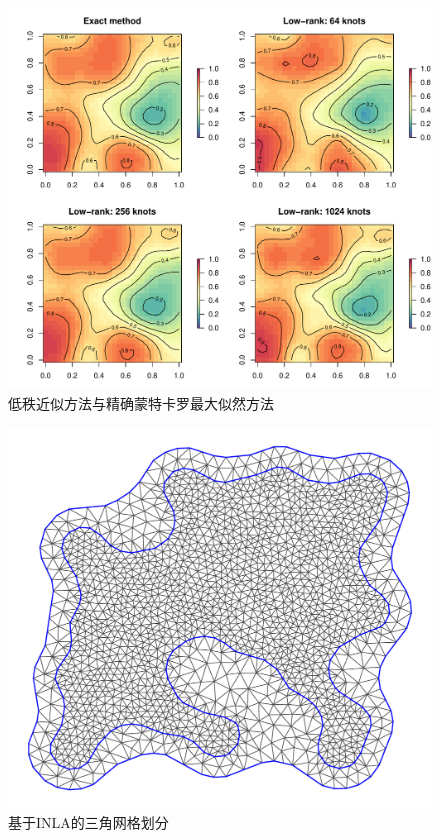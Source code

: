 \documentclass[hyperref, a4paper, UTF8, zihao = -4, linespread = 1.25, scheme = chinese]{ctexbook}
\begin{document}
\begin{figure}

{\centering \includegraphics[width=0.9\linewidth]{figures/simulation} 

}

\caption{低秩近似方法与精确蒙特卡罗最大似然方法}\label{fig:low-rank}
\end{figure}
\begin{figure}

{\centering \includegraphics[width=0.7\linewidth]{figures/mesh-spde} 

}

\caption{基于INLA的三角网格划分}\label{fig:mesh-spde}
\end{figure}
\end{document}

